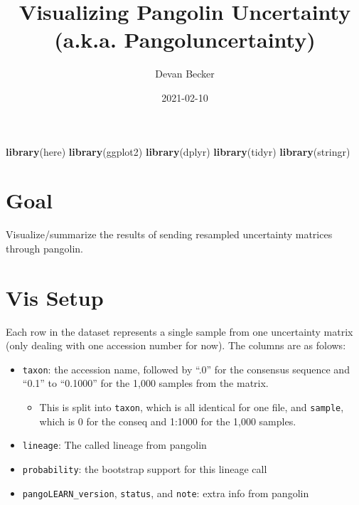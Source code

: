 \documentclass[]{article}
\title{Visualizing Pangolin Uncertainty (a.k.a. Pangoluncertainty)}
\author{Devan Becker}
\date{2021-02-10}
\newenvironment{Shaded}{\begin{snugshade}}{\end{snugshade}}
\newcommand{\KeywordTok}[1]{\textcolor[rgb]{0.13,0.29,0.53}{\textbf{#1}}}
\newcommand{\NormalTok}[1]{#1}
\providecommand{\tightlist}{%
  \setlength{\itemsep}{0pt}\setlength{\parskip}{0pt}}
\begin{document}
\maketitle

\begin{Shaded}
\begin{Highlighting}[]
\KeywordTok{library}\NormalTok{(here)}
\KeywordTok{library}\NormalTok{(ggplot2)}
\KeywordTok{library}\NormalTok{(dplyr)}
\KeywordTok{library}\NormalTok{(tidyr)}
\KeywordTok{library}\NormalTok{(stringr)}
\end{Highlighting}
\end{Shaded}

\hypertarget{goal}{%
\section{Goal}\label{goal}}

Visualize/summarize the results of sending resampled uncertainty
matrices through pangolin.

\hypertarget{vis-setup}{%
\section{Vis Setup}\label{vis-setup}}

Each row in the dataset represents a single sample from one uncertainty
matrix (only dealing with one accession number for now). The columns are
as folows:

\begin{itemize}
\tightlist
\item
  \texttt{taxon}: the accession name, followed by ``.0'' for the
  consensus sequence and ``0.1'' to ``0.1000'' for the 1,000 samples
  from the matrix.

  \begin{itemize}
  \tightlist
  \item
    This is split into \texttt{taxon}, which is all identical for one
    file, and \texttt{sample}, which is 0 for the conseq and 1:1000 for
    the 1,000 samples.
  \end{itemize}
\item
  \texttt{lineage}: The called lineage from pangolin
\item
  \texttt{probability}: the bootstrap support for this lineage call
\item
  \texttt{pangoLEARN\_version}, \texttt{status}, and \texttt{note}:
  extra info from pangolin
\end{itemize}
\end{document}
